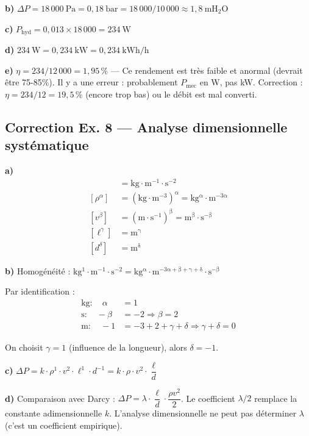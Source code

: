 \textbf{b)} $\Delta P = 18\,000~\mathrm{Pa} = 0{,}18~\mathrm{bar} = 18\,000 / 10\,000 \approx 1{,}8~\mathrm{mH_2O}$

\textbf{c)} $P_{\text{hyd}} = 0{,}013 \times 18\,000 = 234~\mathrm{W}$

\textbf{d)} $234~\mathrm{W} = 0{,}234~\mathrm{kW} = 0{,}234~\mathrm{kWh/h}$

\textbf{e)} $\eta = 234 / 12\,000 = 1{,}95\,\%$ — Ce rendement est très faible et anormal (devrait être 75-85\%). 
Il y a une erreur : probablement $P_{\text{mec}}$ en W, pas kW. Correction : $\eta = 234 / 12 = 19{,}5\,\%$ (encore trop bas) 
ou le débit est mal converti.

\subsection*{Correction Ex. 8 — Analyse dimensionnelle systématique}

\textbf{a)} 
\begin{align*}
  [\Delta P] &= \mathrm{kg \cdot m^{-1} \cdot s^{-2}} \\
  [\rho^\alpha] &= \mathrm{(kg \cdot m^{-3})^\alpha} = \mathrm{kg^\alpha \cdot m^{-3\alpha}} \\
  [v^\beta] &= \mathrm{(m \cdot s^{-1})^\beta} = \mathrm{m^\beta \cdot s^{-\beta}} \\
  [\ell^\gamma] &= \mathrm{m^\gamma} \\
  [d^\delta] &= \mathrm{m^\delta}
\end{align*}

\textbf{b)} Homogénéité : $\mathrm{kg^1 \cdot m^{-1} \cdot s^{-2}} = \mathrm{kg^\alpha \cdot m^{-3\alpha + \beta + \gamma + \delta} \cdot s^{-\beta}}$

Par identification :
\begin{align*}
  \text{kg} : \quad \alpha &= 1 \\
  \text{s} : \quad -\beta &= -2 \Rightarrow \beta = 2 \\
  \text{m} : \quad -1 &= -3 + 2 + \gamma + \delta \Rightarrow \gamma + \delta = 0
\end{align*}

On choisit $\gamma = 1$ (influence de la longueur), alors $\delta = -1$.

\textbf{c)} $\Delta P = k \cdot \rho^1 \cdot v^2 \cdot \ell^1 \cdot d^{-1} = k \cdot \rho \cdot v^2 \cdot \dfrac{\ell}{d}$

\textbf{d)} Comparaison avec Darcy : $\Delta P = \lambda \cdot \dfrac{\ell}{d} \cdot \dfrac{\rho v^2}{2}$. 
Le coefficient $\lambda/2$ remplace la constante adimensionnelle $k$. L'analyse dimensionnelle ne peut pas déterminer 
$\lambda$ (c'est un coefficient empirique).

